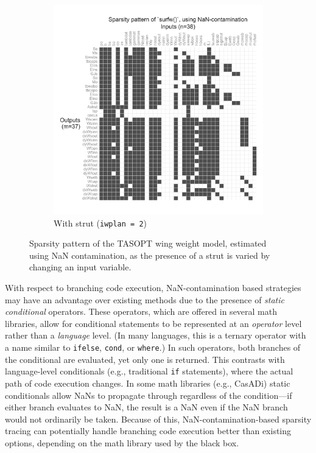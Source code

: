 \begin{figure}[H]
\begin{subfigure}{0.49\textwidth}
        \includegraphics[width=\textwidth]{../figures/nan-propagation/image5.png}
        \caption{With strut (\texttt{iwplan = 2})}
    \end{subfigure}
    \caption{Sparsity pattern of the TASOPT wing weight model, estimated using NaN contamination, as the presence of a strut is varied by changing an input variable.}
    \label{fig:nan-jacobian-branching}
\end{figure}

With respect to branching code execution, NaN-contamination based strategies may have an advantage over existing methods due to the presence of \emph{static conditional} operators. These operators, which are offered in several math libraries, allow for conditional statements to be represented at an \emph{operator} level rather than a \emph{language} level. (In many languages, this is a ternary operator with a name similar to \texttt{ifelse}, \texttt{cond}, or \texttt{where}.) In such operators, both branches of the conditional are evaluated, yet only one is returned. This contrasts with language-level conditionals (e.g., traditional \texttt{if} statements), where the actual path of code execution changes. In some math libraries (e.g., CasADi) static conditionals allow NaNs to propagate through regardless of the condition—if either branch evaluates to NaN, the result is a NaN even if the NaN branch would not ordinarily be taken. Because of this, NaN-contamination-based sparsity tracing can potentially handle branching code execution better than existing options, depending on the math library used by the black box.


